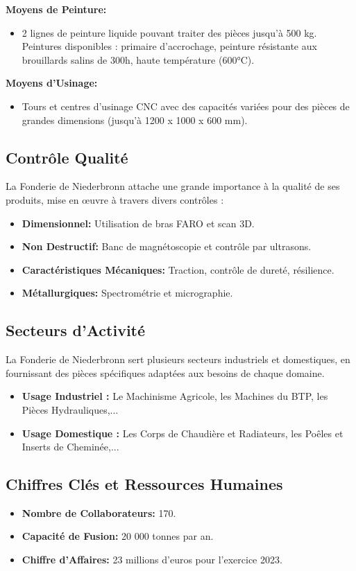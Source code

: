 \documentclass[12pt]{article}
\begin{document}
\textbf{Moyens de Peinture:}
\begin{itemize}
    \item 2 lignes de peinture liquide pouvant traiter des pièces jusqu'à 500 kg. Peintures disponibles : primaire d'accrochage, peinture résistante aux brouillards salins de 300h, haute température (600°C).
\end{itemize}

\textbf{Moyens d'Usinage:}
\begin{itemize}
    \item Tours et centres d'usinage CNC avec des capacités variées pour des pièces de grandes dimensions (jusqu'à 1200 x 1000 x 600 mm).
\end{itemize}

\subsection*{Contrôle Qualité}
La Fonderie de Niederbronn attache une grande importance à la qualité de ses produits, mise en œuvre à travers divers contrôles :
\begin{itemize}
    \item \textbf{Dimensionnel:} Utilisation de bras FARO et scan 3D.
    \item \textbf{Non Destructif:} Banc de magnétoscopie et contrôle par ultrasons.
    \item \textbf{Caractéristiques Mécaniques:} Traction, contrôle de dureté, résilience.
    \item \textbf{Métallurgiques:} Spectrométrie et micrographie.
\end{itemize}

\subsection*{Secteurs d'Activité}
\sloppy
La Fonderie de Niederbronn sert plusieurs secteurs industriels et domestiques, 
en fournissant des pièces spécifiques adaptées aux besoins de chaque domaine.
\begin{itemize}
    \item \textbf{Usage Industriel :} Le Machinisme Agricole, les Machines du BTP, les Pièces Hydrauliques,...
    \item \textbf{Usage Domestique :} Les Corps de Chaudière et Radiateurs, les Poêles et Inserts de Cheminée,...
\end{itemize}

\subsection*{Chiffres Clés et Ressources Humaines}
\begin{itemize}
    \item \textbf{Nombre de Collaborateurs:} 170.
    \item \textbf{Capacité de Fusion:} 20 000 tonnes par an.
    \item \textbf{Chiffre d'Affaires:} 23 millions d'euros pour l'exercice 2023.
\end{itemize}
\end{document}
